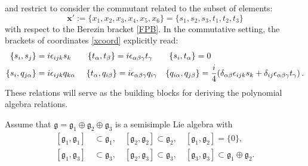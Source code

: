 \documentclass[10pt,a4paper]{amsart}
\begin{document}
 and restrict to consider the commutant related to the subset of elements: 
 \begin{equation}
 \boldsymbol{x}':= \{x_1, x_2, x_3, x_4, x_5, x_6\} = \{s_1, s_2, s_3, t_1, t_2, t_3\} 
 \label{subalgebcoordin}
 \end{equation}
with respect to the Berezin bracket  \eqref{FPB}. In the commutative setting, the brackets of coordinates \eqref{xcoord} explicitly read:
\begin{equation}
\begin{split}
\{s_i, s_j\}&={\rm i} \epsilon_{ijk}s_k \qquad \{t_\alpha, t_\beta\}={\rm i} \epsilon_{\alpha \beta \gamma}t_\gamma \qquad \{s_i, t_\alpha\}=0 \\
\{s_i,q_{j\alpha}\}&={\rm i} \epsilon_{ijk} q_{k \alpha} \quad \,\, \{t_\alpha, q_{i\beta}\}={\rm i} \epsilon_{\alpha \beta \gamma} q_{i \gamma} \quad \{q_{i \alpha}, q_{j \beta}\}=\frac{{\rm i}}{4}(\delta_{\alpha \beta} \epsilon_{ijk}s_k+\delta_{ij}\epsilon_{\alpha \beta \gamma}t_\gamma) \, .
\label{classicalrels}
\end{split}
\end{equation}
 These relations will serve as the building blocks for deriving the polynomial algebra relations.
\vskip 0.5cm

Assume that $\mathfrak{g} = \mathfrak{g}_1 \oplus \mathfrak{g}_2 \oplus \mathfrak{g}_3$ is a semisimple Lie algebra  with  \begin{align}
\nonumber
    [\mathfrak{g}_1,\mathfrak{g}_1] & \,\subset \mathfrak{g}_1, \quad  [\mathfrak{g}_2,\mathfrak{g}_2] \subset \mathfrak{g}_2, \quad  [\mathfrak{g}_1,\mathfrak{g}_2] = \{0\},  \\
    [\mathfrak{g}_1,\mathfrak{g}_3] & \,\subset \mathfrak{g}_3, \quad  [\mathfrak{g}_2,\mathfrak{g}_3] \subset \mathfrak{g}_3, \quad  [\mathfrak{g}_3,\mathfrak{g}_3] \subset \mathfrak{g}_1 \oplus \mathfrak{g}_2. \label{eq:c1}
\end{align} 
\end{document}
